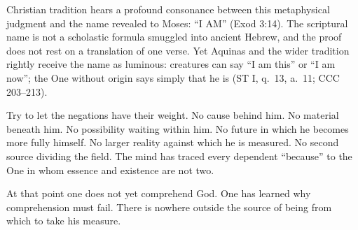 Christian tradition hears a profound consonance between this metaphysical judgment and the name revealed to Moses: ``I AM'' (Exod 3:14). The scriptural name is not a scholastic formula smuggled into ancient Hebrew, and the proof does not rest on a translation of one verse. Yet Aquinas and the wider tradition rightly receive the name as luminous: creatures can say ``I am this'' or ``I am now''; the One without origin says simply that he is (ST I, q.~13, a.~11; CCC 203--213).

Try to let the negations have their weight. No cause behind him. No material beneath him. No possibility waiting within him. No future in which he becomes more fully himself. No larger reality against which he is measured. No second source dividing the field. The mind has traced every dependent ``because'' to the One in whom essence and existence are not two.

At that point one does not yet comprehend God. One has learned why comprehension must fail. There is nowhere outside the source of being from which to take his measure.
